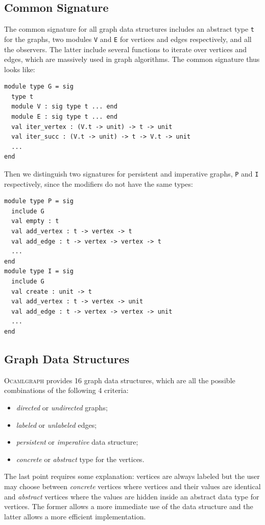 \documentclass[tfpsymp]{tfp05symp}
\newcommand{\ocamlgraph}{\textsc{Ocamlgraph}\xspace}
\begin{document}
\subsection{Common Signature}\label{interface}

The common signature for all graph data structures includes an
abstract type \texttt{t} for the graphs, two modules \texttt{V} and
\texttt{E} for vertices and edges respectively, and all the
observers. The latter include several functions to iterate over
vertices and edges, which are massively used in graph algorithms. 
The common signature thus looks like:
\begin{verbatim}
module type G = sig
  type t
  module V : sig type t ... end
  module E : sig type t ... end
  val iter_vertex : (V.t -> unit) -> t -> unit
  val iter_succ : (V.t -> unit) -> t -> V.t -> unit
  ...
end
\end{verbatim}
Then we distinguish two signatures for persistent and imperative
graphs, \texttt{P} and \texttt{I} respectively, since the modifiers do
not have the same types:
\begin{verbatim}
module type P = sig
  include G
  val empty : t
  val add_vertex : t -> vertex -> t
  val add_edge : t -> vertex -> vertex -> t
  ...
end
module type I = sig
  include G
  val create : unit -> t
  val add_vertex : t -> vertex -> unit
  val add_edge : t -> vertex -> vertex -> unit
  ...
end
\end{verbatim}

\subsection{Graph Data Structures}\label{structuresdedonnees}

\ocamlgraph provides 16 graph data structures, which are all the
possible combinations of the following 4 criteria:
\begin{itemize}
\item \emph{directed} or \emph{undirected} graphs;
\item \emph{labeled} or \emph{unlabeled} edges;
\item \emph{persistent} or \emph{imperative} data structure;
\item \emph{concrete} or \emph{abstract} type for the vertices.
\end{itemize}
The last point requires some explanation: vertices are always labeled
but the user may choose between \emph{concrete} vertices where vertices and
their values are identical and \emph{abstract} vertices where the
values are hidden inside an abstract data type for vertices. The
former allows a more immediate use of the data structure and the
latter allows a more efficient implementation.
\end{document}
